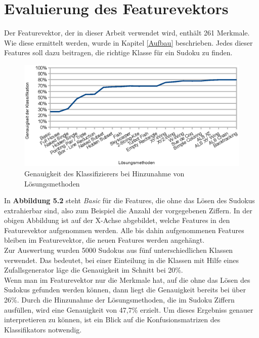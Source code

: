 \newpage
\section{Evaluierung des Featurevektors}
Der Featurevektor, der in dieser Arbeit verwendet wird, enthält 261 Merkmale. Wie diese ermittelt werden, wurde in Kapitel \ref{Aufbau} beschrieben. Jedes dieser Features soll dazu beitragen, die richtige Klasse für ein Sudoku zu finden.\\

\begin{figure}[H]
    \includegraphics[width=\textwidth,height=\textheight,keepaspectratio]{./img/accuracy.eps}
    \caption{Genauigkeit des Klassifizierers bei Hinzunahme von Lösungsmethoden}
\end{figure}
\noindent In \textbf{Abbildung 5.2} steht \textit{Basic} für die Features, die ohne das Lösen des Sudokus extrahierbar sind, also zum Beispiel die Anzahl der vorgegebenen Ziffern. In der obigen Abbildung ist auf der X-Achse abgebildet, welche Features in den Featurevektor aufgenommen werden. Alle bis dahin aufgenommenen Features bleiben im Featurevektor, die neuen Features werden angehängt.\\
Zur Auswertung wurden 5000 Sudokus aus fünf unterschiedlichen Klassen verwendet. Das bedeutet, bei einer Einteilung in die Klassen mit Hilfe eines Zufallsgenerator läge die Genauigkeit im Schnitt bei 20\%.\\
Wenn man im Featurevektor nur die Merkmale hat, auf die ohne das Lösen des Sudokus gefunden werden können, dann liegt die Genauigkeit bereits bei über 26\%. Durch die Hinzunahme der Lösungsmethoden, die im Sudoku Ziffern ausfüllen, wird eine Genauigkeit von 47,7\% erzielt. Um dieses Ergebniss genauer interpretieren zu können, ist ein Blick auf die Konfusionsmatrizen des Klassifikators notwendig.\\

